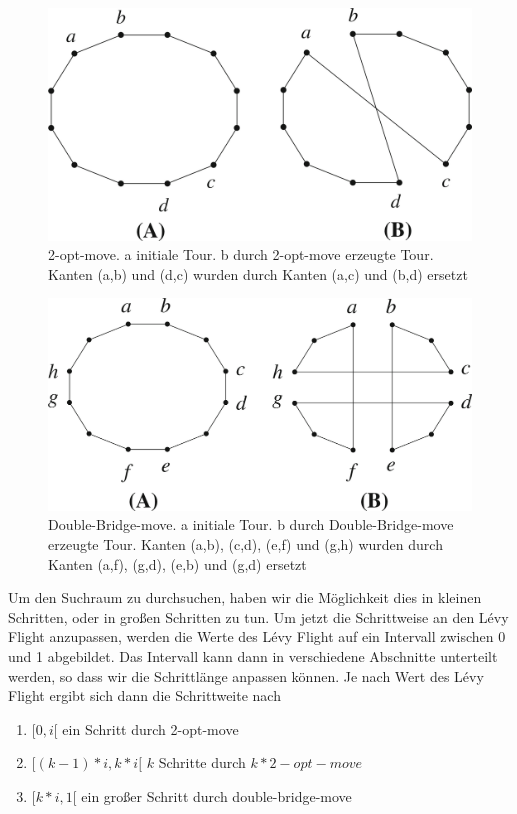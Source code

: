 \documentclass[conference]{IEEEtran}
\begin{document}
      \begin{figure}
      \centering
        \includegraphics[width=1\linewidth]{2-opt-move.png}
        \caption{2-opt-move. a initiale Tour. b durch 2-opt-move erzeugte Tour. Kanten (a,b) und (d,c) wurden durch Kanten (a,c) und (b,d) ersetzt}
        \label{fig:2-opt-move}
      \end{figure}

      \begin{figure}
      \centering
        \includegraphics[width=1\linewidth]{double-Bridge.png}
        \caption{Double-Bridge-move. a initiale Tour. b durch Double-Bridge-move erzeugte Tour. Kanten 
        (a,b), (c,d), (e,f) und (g,h) wurden durch Kanten (a,f), (g,d), (e,b) und (g,d) ersetzt}
        \label{fig:double-bridge-move}
      \end{figure}

      Um den Suchraum zu durchsuchen, haben wir die Möglichkeit dies in kleinen Schritten, 
      oder in großen Schritten zu tun. Um jetzt die Schrittweise an den Lévy Flight anzupassen, 
      werden die Werte des Lévy Flight auf ein Intervall zwischen 0 und 1 abgebildet. Das Intervall kann dann in 
      verschiedene Abschnitte unterteilt werden, so dass wir die Schrittlänge anpassen können.
      Je nach Wert des Lévy Flight ergibt sich dann die Schrittweite nach
      \begin{enumerate}
        \item$[0,i[$ ein Schritt durch 2-opt-move
        \item$[(k-1)*i, k*i[$ $k$ Schritte durch $k * 2-opt-move$
        \item$[k*i,1[$ ein großer Schritt durch double-bridge-move
      \end{enumerate}
\end{document}
